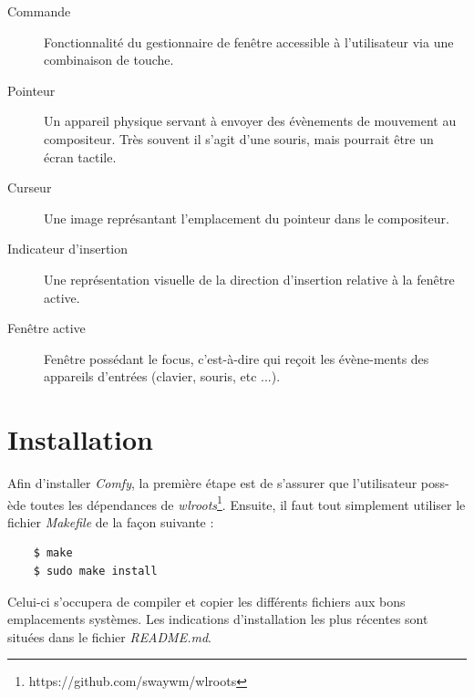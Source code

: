 \documentclass[titlepage]{article}
\begin{document}
\begin{description}
	\item [Commande] Fonctionnalité du gestionnaire de fenêtre accessible à l'utilisateur via une combinaison de touche.
	\item [Pointeur] Un appareil physique servant à envoyer des évènements de mouvement au compositeur. Très souvent il s'agit d'une souris, mais pourrait être un écran tactile.
	\item [Curseur] Une image représantant l'emplacement du pointeur dans le compositeur.
	\item [Indicateur d'insertion] Une représentation visuelle de la direction d'insertion relative à la fenêtre active.
	\item [Fenêtre active] Fenêtre possédant le focus, c'est-à-dire qui reçoit les évène-ments des appareils d'entrées (clavier, souris, etc ...).
\end{description}

\section{Installation}
Afin d'installer \textit{Comfy}, la première étape est de s'assurer que l'utilisateur poss-ède toutes les dépendances de \textit{wlroots}\footnote{https://github.com/swaywm/wlroots}. Ensuite, il faut tout simplement utiliser le fichier \textit{Makefile} de la façon suivante :
\begin{verbatim}
	$ make
	$ sudo make install
\end{verbatim}

\par
Celui-ci s'occupera de compiler et copier les différents fichiers aux bons emplacements systèmes. Les indications d'installation les plus récentes sont situées dans le fichier \textit{README.md}.
\end{document}
